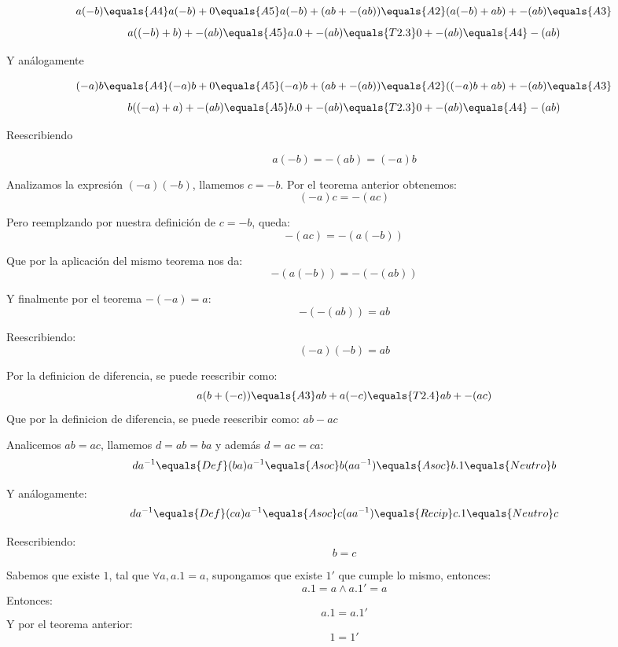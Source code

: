 \documentclass[10pt]{article}
\begin{document}
\begin{prf}[$a(-b)=-(ab)=(-a)b$]{}
$$
a(-b) \equals{A4}
a(-b)+0 \equals{A5}
a(-b)+(ab+-(ab)) \equals{A2}
(a(-b)+ab)+-(ab) \equals{A3}$$$$
a((-b)+b)+-(ab) \equals{A5}
a.0+-(ab) \equals{T2.3}
0+-(ab) \equals{A4}
-(ab)
$$

Y análogamente

$$
(-a)b \equals{A4}
(-a)b+0 \equals{A5}
(-a)b+(ab+-(ab)) \equals{A2}
((-a)b+ab)+-(ab) \equals{A3}$$$$
b((-a)+a)+-(ab) \equals{A5}
b.0+-(ab) \equals{T2.3}
0+-(ab) \equals{A4}
-(ab)
$$

Reescribiendo

$$a(-b)=-(ab)=(-a)b$$
\end{prf}

\begin{prf}[$(-a)(-b)=ab$]{}
Analizamos la expresión $(-a)(-b)$, llamemos $c = -b$.
Por el teorema anterior obtenemos:
$$(-a)c = -(ac)$$

Pero reemplzando por nuestra definición de $c = -b$, queda:
$$-(ac) = -(a(-b))$$

Que por la aplicación del mismo teorema nos da:
$$-(a(-b)) = -(-(ab))$$

Y finalmente por el teorema $-(-a) = a$:
$$-(-(ab)) = ab$$

Reescribiendo:
$$(-a)(-b) = ab$$

\end{prf}

\begin{prf}[$a(b-c)=ab-ac$]{}
Por la definicion de diferencia, se puede reescribir como:
$$
a(b+(-c)) \equals{A3}
ab+a(-c) \equals{T2.4}
ab+-(ac)
$$
Que por la definicion de diferencia, se puede reescribir como: $ab-ac$
\end{prf}

\begin{prf}{}
Analicemos $ab = ac$, llamemos $d = ab = ba$ y además $d = ac = ca$:
$$
da^{-1} \equals{Def}
(ba)a^{-1} \equals{Asoc}
b(aa^{-1}) \equals{Asoc}
b.1 \equals{Neutro}
b
$$

Y análogamente:
$$
da^{-1} \equals{Def}
(ca)a^{-1} \equals{Asoc}
c(aa^{-1}) \equals{Recip}
c.1 \equals{Neutro}
c
$$

Reescribiendo:
$$b = c$$
\end{prf}

\begin{prf}{}
Sabemos que existe $1$, tal que $\forall a, a.1 = a$, supongamos que existe $1'$ que cumple lo mismo, entonces:
$$a.1 = a \land a.1' = a$$
Entonces:
$$a.1 = a.1'$$
Y por el teorema anterior:
$$1 = 1'$$
\end{prf}
\end{document}
